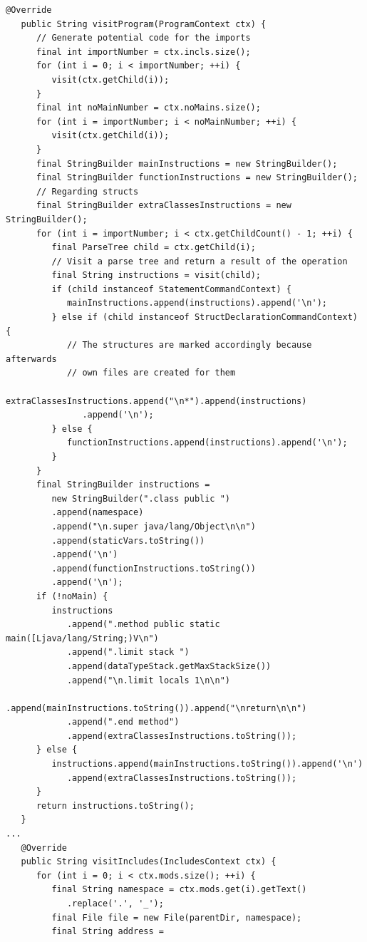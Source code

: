 \begin{lstlisting}[frame=htrbl, caption={Implementation of {\ttfamily EVisitor.java}}, label={lst:visitor}, basicstyle=\footnotesize]
   @Override
   public String visitProgram(ProgramContext ctx) {
      // Generate potential code for the imports
      final int importNumber = ctx.incls.size();
      for (int i = 0; i < importNumber; ++i) {
         visit(ctx.getChild(i));
      }
      final int noMainNumber = ctx.noMains.size();
      for (int i = importNumber; i < noMainNumber; ++i) {
         visit(ctx.getChild(i));
      }
      final StringBuilder mainInstructions = new StringBuilder();
      final StringBuilder functionInstructions = new StringBuilder();
      // Regarding structs
      final StringBuilder extraClassesInstructions = new StringBuilder();
      for (int i = importNumber; i < ctx.getChildCount() - 1; ++i) {
         final ParseTree child = ctx.getChild(i);
         // Visit a parse tree and return a result of the operation
         final String instructions = visit(child);
         if (child instanceof StatementCommandContext) {
            mainInstructions.append(instructions).append('\n');
         } else if (child instanceof StructDeclarationCommandContext) {
            // The structures are marked accordingly because afterwards 
            // own files are created for them
            extraClassesInstructions.append("\n*").append(instructions)
               .append('\n');
         } else {
            functionInstructions.append(instructions).append('\n');
         }
      }
      final StringBuilder instructions = 
         new StringBuilder(".class public ")
         .append(namespace)
         .append("\n.super java/lang/Object\n\n")
         .append(staticVars.toString())
         .append('\n')
         .append(functionInstructions.toString())
         .append('\n');
      if (!noMain) {
         instructions
            .append(".method public static main([Ljava/lang/String;)V\n")
            .append(".limit stack ")
            .append(dataTypeStack.getMaxStackSize())
            .append("\n.limit locals 1\n\n")
            .append(mainInstructions.toString()).append("\nreturn\n\n")
            .append(".end method")
            .append(extraClassesInstructions.toString());
      } else {
         instructions.append(mainInstructions.toString()).append('\n')
            .append(extraClassesInstructions.toString());
      }
      return instructions.toString();
   }
...
   @Override
   public String visitIncludes(IncludesContext ctx) {
      for (int i = 0; i < ctx.mods.size(); ++i) {
         final String namespace = ctx.mods.get(i).getText()
            .replace('.', '_');
         final File file = new File(parentDir, namespace);
         final String address =

\end{lstlisting}
